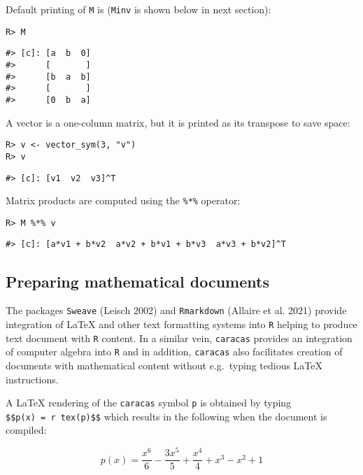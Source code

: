Default printing of \texttt{M} is (\texttt{Minv} is shown below in next section):

\begin{verbatim}
R> M
\end{verbatim}

\begin{verbatim}
#> [c]: [a  b  0]
#>      [       ]
#>      [b  a  b]
#>      [       ]
#>      [0  b  a]
\end{verbatim}

A vector is a one-column matrix, but it is printed as its transpose to save space:

\begin{verbatim}
R> v <- vector_sym(3, "v")
R> v
\end{verbatim}

\begin{verbatim}
#> [c]: [v1  v2  v3]^T
\end{verbatim}

Matrix products are computed using the \texttt{\%*\%} operator:

\begin{verbatim}
R> M %*% v
\end{verbatim}

\begin{verbatim}
#> [c]: [a*v1 + b*v2  a*v2 + b*v1 + b*v3  a*v3 + b*v2]^T
\end{verbatim}

\hypertarget{preparing-mathematical-documents}{%
\subsection{Preparing mathematical documents}\label{preparing-mathematical-documents}}

The packages \texttt{Sweave} (Leisch 2002) and \texttt{Rmarkdown} (Allaire et al. 2021) provide
integration of LaTeX and other text formatting systems into \texttt{R} helping to produce
text document with \texttt{R} content. In a similar vein, \texttt{caracas} provides an integration
of computer algebra into \texttt{R} and in addition, \texttt{caracas} also facilitates creation
of documents with mathematical content without e.g.~typing tedious
LaTeX instructions.

A LaTeX rendering of the \texttt{caracas} symbol \texttt{p} is obtained by typing
\texttt{\$\$p(x)\ =\ \textasciigrave{}r\ tex(p)\textasciigrave{}\$\$} which results in the following when the document is compiled:

\[
p(x) = \frac{x^{6}}{6} - \frac{3 x^{5}}{5} + \frac{x^{4}}{4} + x^{3} - x^{2} + 1
\]

